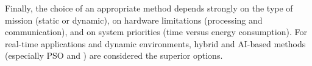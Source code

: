 Finally, the choice of an appropriate method depends strongly on the type of
mission (static or dynamic), on hardware limitations (processing and
communication), and on system priorities (time versus energy consumption). For
real-time applications and dynamic environments, hybrid and AI-based methods
(especially PSO and \RRTstar) are considered the superior options.
